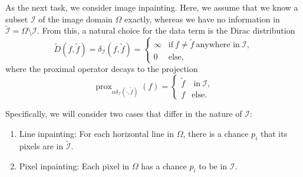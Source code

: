 \documentclass[../ml-ct.tex]{subfiles}
\begin{document}
As the next task, we consider image inpainting.
Here, we assume that we know a subset \( \mathcal{I} \) of the image domain \( \Omega \) exactly, whereas we have no information in \( \tilde{\mathcal{I}} = \Omega \setminus \mathcal{I} \).
From this, a natural choice for the data term is the Dirac distribution
\begin{equation}
	\tilde{D}(f, \tilde{f}) = \delta_{\mathcal{I}}(f, \tilde{f}) = \begin{cases}
		\infty & \text{if}\ f\neq \tilde{f}\ \text{anywhere in}\ \mathcal{I}, \\
		0 & \text{else},
	\end{cases}
\end{equation}
where the proximal operator decays to the projection
\begin{equation}
	\operatorname{prox}_{\alpha\delta_{\mathcal{I}}(\cdot, \tilde{f})} (f) =  \begin{cases}
		\tilde{f} &\ \text{in}\ \mathcal{I},\\
		f & \text{else}.
	\end{cases}
\end{equation}

Specifically, we will consider two cases that differ in the nature of \( \mathcal{I} \):
\begin{enumerate}
	\item Line inpainting: For each horizontal line in \( \Omega \), there is a chance \( p_i \) that its pixels are in \( \tilde{\mathcal{I}} \).
	\item Pixel inpainting: Each pixel in \( \Omega \) has a chance \( p_i \) to be in \( \mathcal{I} \).
\end{enumerate}
\end{document}
